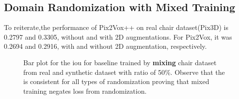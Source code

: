 \subsection{Domain Randomization with Mixed Training}\label{subsec:domain-randomisation-with-mixed-training}
To reiterate,the performance of Pix2Vox++ on real chair dataset(Pix3D) is 0.2797 and 0.3305, without and with 2D augmentations.
For Pix2Vox, it was 0.2694 and 0.2916, with and without 2D augmentation, respectively.

\begin{figure}[ht]
    \centering
    \resizebox{0.9\textwidth}{!}{}
    \caption[\gls{iou} Comparison for Ablation Datasets with Mixed Training.]{Bar plot for the \gls{iou}  for baseline trained by \textbf{mixing} chair dataset from real and synthetic dataset with ratio of 50\%.
    Observe that the  is consistent for all types of randomization proving that mixed training negates loss from randomization.}
    \label{fig:ablation2}
\end{figure}



